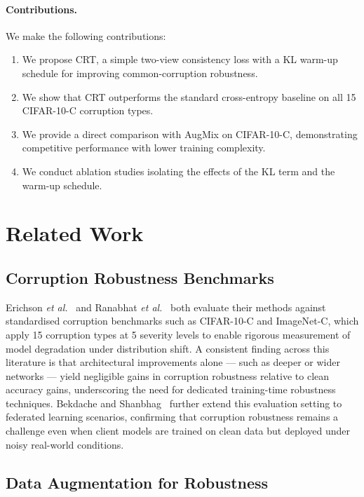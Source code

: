 \documentclass[10pt,twocolumn]{article}
\begin{document}
\paragraph{Contributions.} We make the following contributions:
\begin{enumerate}[leftmargin=*, topsep=2pt, itemsep=1pt]
  \item We propose CRT, a simple two-view consistency loss with a KL warm-up schedule for improving common-corruption robustness.
  \item We show that CRT outperforms the standard cross-entropy baseline on all 15 CIFAR-10-C corruption types.
  \item We provide a direct comparison with AugMix on CIFAR-10-C, demonstrating competitive performance with lower training complexity.
  \item We conduct ablation studies isolating the effects of the KL term and the warm-up schedule.
\end{enumerate}

\section{Related Work}

\subsection{Corruption Robustness Benchmarks}

Erichson \emph{et al.}~\cite{erichson2024noisymix} and Ranabhat \emph{et al.}~\cite{ranabhat2025shapebias} both evaluate their methods against standardised corruption benchmarks such as CIFAR-10-C and ImageNet-C, which apply 15 corruption types at 5 severity levels to enable rigorous measurement of model degradation under distribution shift. A consistent finding across this literature is that architectural improvements alone --- such as deeper or wider networks --- yield negligible gains in corruption robustness relative to clean accuracy gains, underscoring the need for dedicated training-time robustness techniques. Bekdache and Shanbhag~\cite{bekdache2025federl} further extend this evaluation setting to federated learning scenarios, confirming that corruption robustness remains a challenge even when client models are trained on clean data but deployed under noisy real-world conditions.

\subsection{Data Augmentation for Robustness}
\end{document}
